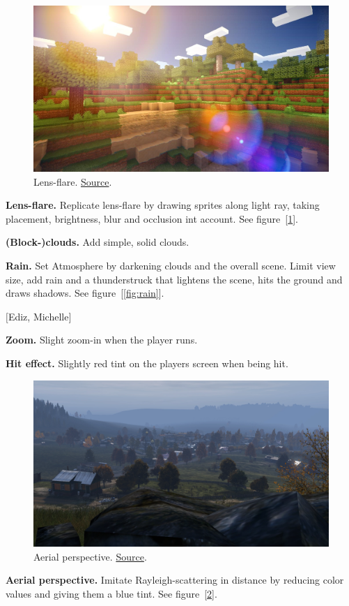 \documentclass[A4paper]{gdv/gdv}
\newcommand{\teilaufgabe}[1]{\textbf{#1.}}
\begin{document}
\begin{gdvSheet}
\begin{figure}[ht]
	\centering
	\includegraphics[width=.4\textwidth]{img/lens-flare}
	\caption{Lens-flare. \href{https://www.minecraftforum.net/forums/mapping-and-modding-java-edition/minecraft-mods/1293898-1-14-chocapic13s-shaders?page=2}{Source}.}\label{fig:flare}
\end{figure}

\teilaufgabe{Lens-flare}
Replicate lens-flare by drawing sprites along light ray, taking placement, brightness, blur and occlusion int account.
See figure~[\ref{fig:flare}].

\teilaufgabe{(Block-)clouds}
Add simple, solid clouds.

\teilaufgabe{Rain}
Set Atmosphere by darkening clouds and the overall scene.
Limit view size, add rain and a thunderstruck that lightens the scene, hits the ground and draws shadows.
See figure~[\ref{fig:rain}].

$[$Ediz, Michelle$]$

\teilaufgabe{Zoom}
Slight zoom-in when the player runs.

\teilaufgabe{Hit effect}
Slightly red tint on the players screen when being hit.

\begin{figure}[ht]
	\centering
	\includegraphics[width=.4\textwidth]{img/distance-blue}
	\caption{Aerial perspective. \href{https://feedback.bistudio.com/T141632}{Source}.}\label{fig:blue}
\end{figure}

\teilaufgabe{Aerial perspective}
Imitate Rayleigh-scattering in distance by reducing color values and giving them a blue tint.
See figure~[\ref{fig:blue}].



\pagebreak
\underline{}


\end{gdvSheet}
\end{document}
